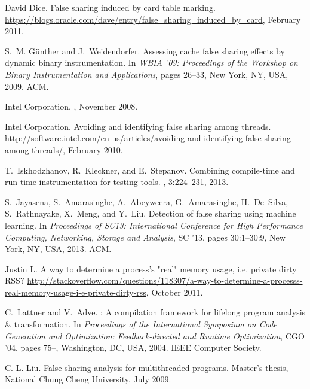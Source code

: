 \documentclass[10pt]{sigplanconf}
\begin{document}
\begin{thebibliography}{10}
{David Dice}.
\newblock False sharing induced by card table marking.
\newblock
  \url{https://blogs.oracle.com/dave/entry/false_sharing_induced_by_card},
  February 2011.

S.~M. G\"{u}nther and J.~Weidendorfer.
\newblock Assessing cache false sharing effects by dynamic binary
  instrumentation.
\newblock In {\em WBIA '09: Proceedings of the Workshop on Binary
  Instrumentation and Applications}, pages 26--33, New York, NY, USA, 2009.
  ACM.

{Intel Corporation}.
, November 2008.

{Intel Corporation}.
\newblock Avoiding and identifying false sharing among threads.
\newblock
  \url{http://software.intel.com/en-us/articles/avoiding-and-identifying-false-sharing-among-threads/},
  February 2010.

T.~Iskhodzhanov, R.~Kleckner, and E.~Stepanov.
\newblock Combining compile-time and run-time instrumentation for testing
  tools.
, 3:224--231, 2013.

S.~Jayasena, S.~Amarasinghe, A.~Abeyweera, G.~Amarasinghe, H.~De~Silva,
  S.~Rathnayake, X.~Meng, and Y.~Liu.
\newblock Detection of false sharing using machine learning.
\newblock In {\em Proceedings of {SC13}: International Conference for High
  Performance Computing, Networking, Storage and Analysis}, SC '13, pages
  30:1--30:9, New York, NY, USA, 2013. ACM.

{Justin L.}
\newblock A way to determine a process's "real" memory usage, i.e. private
  dirty {RSS}?
\newblock
  \url{http://stackoverflow.com/questions/118307/a-way-to-determine-a-processs-real-memory-usage-i-e-private-dirty-rss},
  October 2011.

C.~Lattner and V.~Adve.
: A compilation framework for lifelong program analysis \&
  transformation.
\newblock In {\em Proceedings of the International Symposium on Code Generation
  and Optimization: Feedback-directed and Runtime Optimization}, CGO '04, pages
  75--, Washington, DC, USA, 2004. IEEE Computer Society.

C.-L. Liu.
\newblock False sharing analysis for multithreaded programs.
\newblock Master's thesis, National Chung Cheng University, July 2009.


\end{thebibliography}
\end{document}
